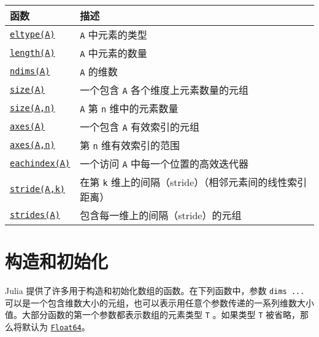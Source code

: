 \begin{table}[h]

\begin{tabulary}{\linewidth}{|L|L|}
\hline
函数 & 描述 \\
\hline
\hyperlink{6396209842929672718}{\texttt{eltype(A)}} & \texttt{A} 中元素的类型 \\
\hline
\hyperlink{3699181304419743826}{\texttt{length(A)}} & \texttt{A} 中元素的数量 \\
\hline
\hyperlink{1688406579181746010}{\texttt{ndims(A)}} & \texttt{A} 的维数 \\
\hline
\hyperlink{17888996102305087038}{\texttt{size(A)}} & 一个包含 \texttt{A} 各个维度上元素数量的元组 \\
\hline
\hyperlink{17888996102305087038}{\texttt{size(A,n)}} & \texttt{A} 第 \texttt{n} 维中的元素数量 \\
\hline
\hyperlink{7074821531920287868}{\texttt{axes(A)}} & 一个包含 \texttt{A} 有效索引的元组 \\
\hline
\hyperlink{7074821531920287868}{\texttt{axes(A,n)}} & 第 \texttt{n} 维有效索引的范围 \\
\hline
\hyperlink{4701773772897287974}{\texttt{eachindex(A)}} & 一个访问 \texttt{A} 中每一个位置的高效迭代器 \\
\hline
\hyperlink{97811245619734938}{\texttt{stride(A,k)}} & 在第 \texttt{k} 维上的间隔（stride）（相邻元素间的线性索引距离） \\
\hline
\hyperlink{13576557637670855932}{\texttt{strides(A)}} & 包含每一维上的间隔（stride）的元组 \\
\hline
\end{tabulary}

\end{table}



\hypertarget{10907259792659637782}{}


\section{构造和初始化}



Julia 提供了许多用于构造和初始化数组的函数。在下列函数中，参数 \texttt{dims ...} 可以是一个包含维数大小的元组，也可以表示用任意个参数传递的一系列维数大小值。大部分函数的第一个参数都表示数组的元素类型 \texttt{T} 。如果类型 \texttt{T} 被省略，那么将默认为 \hyperlink{5027751419500983000}{\texttt{Float64}}。




